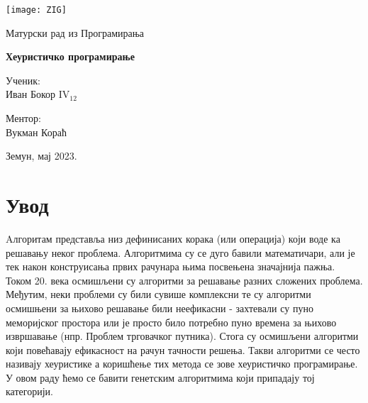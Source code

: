 \documentclass{article}
\begin{document}

\thispagestyle{empty}

\graphicspath{{./images/}}

\begin{center}
    \texttt{[image: ZIG]}
\end{center}

\vspace*{20mm}

\begin{center}
    \Large Матурски рад из Програмирања

    \vspace*{8pt}

    \Huge \textbf{Хеуристичко програмирање}
\end{center}

\vspace*{40mm}

\setlength{\columnsep}{50pt}
\begin{multicols}{2}
 {\noindent \large Ученик:
\\Иван Бокор  IV$_{12}$}

 {\noindent \hfill \large \centering{}Ментор: \\
 \hfill \phantom{111} Вукман Кораћ}

\end{multicols}

\vfill

\begin{center}
    \Large Земун, мај 2023.
\end{center}

\newpage


\tableofcontents


\newpage
{}

\section{Увод}

Aлгоритам представља низ дефинисаних корака (или операција) који воде ка
решавању неког проблема. Алгоритмима су се дуго бавили математичари, али је 
тек након конструисања првих рачунара њима посвењена значајнија пажња. Током 
20. века осмишљени су алгоритми за решавање разних сложених проблема.  Међутим,
неки проблеми су били сувише комплексни те су алгоритми осмишњени за њихово
решавање били неефикасни - захтевали су пуно меморијског простора или је просто 
било потребно пуно времена за њихово извршавање (нпр. Проблем трговачког путника).
Стога су осмишљени алгоритми који повећавају ефикасност на рачун тачности решења.
Такви алгоритми се често називају хеуристике а коришћење тих метода се зове хеуристичко програмирање.
У овом раду ћемо се бавити генетским алгоритмима који припадају тој категорији.
\end{document}
